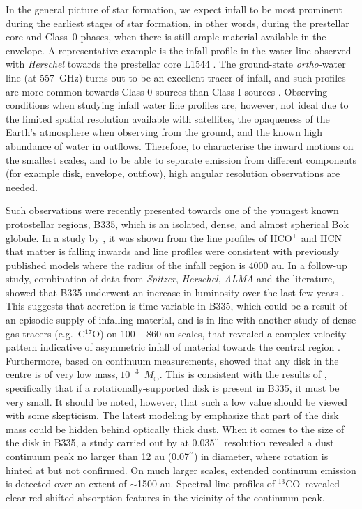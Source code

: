 \documentclass{aa}
\newcommand{\about}{$\sim$}                       %
\newcommand{\expo}[1]{$10^{#1}$}
\newcommand{\trettenco}{$^{13}$CO\xspace}
\newcommand{\asec}{$^{\prime \prime}$}
\newcommand{\msun}{\ensuremath{M_{\odot}}\xspace}
\begin{document}
In the general picture of star formation, we expect infall to be most prominent during the earliest stages of star formation, in other words, during the prestellar core and Class~0 \citep{Andre:1990fk} phases, when there is still ample material available in the envelope. A representative example is the infall profile in the water line observed with {\it Herschel} towards the prestellar core L1544 \citep{Caselli:2012rt}. The ground-state \textit{ortho-}water line (at 557~GHz) turns out to be an excellent tracer of infall, and such profiles are more common towards Class 0 sources than Class I sources \citep{Kristensen:2012kx,Mottram:2013qy}. Observing conditions when studying infall water line profiles are, however, not ideal due to the limited spatial resolution available with satellites, the opaqueness of the Earth's atmosphere when observing from the ground, and the known high abundance of water in outflows. Therefore, to characterise the inward motions on the smallest scales, and to be able to separate emission from different components (for example disk, envelope, outflow), high angular resolution observations are needed.

Such observations were recently presented towards one of the youngest known protostellar regions, B335, which is an isolated, dense, and almost spherical Bok globule. In a study by \citet{Evans:2015qp}, it was shown from the line profiles of HCO$^+$ and HCN that matter is falling inwards and line profiles were consistent with previously published models \citep{Evans:2005qy} where the radius of the infall region is 4000 au. In a follow-up study, combination of data from \textit{Spitzer}, \textit{Herschel}, \textit{ALMA} and the literature, showed that B335 underwent an increase in luminosity over the last few years \citep{Evans:2023aa}. This suggests that accretion is time-variable in B335, which could be a result of an episodic supply of infalling material, and is in line with another study of dense gas tracers (e.g.\ C$^{17}$O) on 100 -- 860 au scales, that revealed a complex velocity pattern indicative of asymmetric infall of material towards the central region \citep{Cabedo:2021hw}. Furthermore, based on continuum measurements, \citet{Evans:2015qp} showed that any disk in the centre is of very low mass,$~$\expo{-3}~\msun. This is consistent with the results of \citet{Yen:2015vf}, specifically that if a rotationally-supported disk is present in B335, it must be very small. It should be noted, however, that such a low value should be viewed with some skepticism. The latest modeling by \citet{Evans:2023aa} emphasize that part of the disk mass could be hidden behind optically thick dust. When it comes to the size of the disk in B335, a study carried out by \citet{Bjerkeli:2019ip} at 0.035\asec\ resolution revealed a dust continuum peak no larger than 12 au (0.07\asec) in diameter, where rotation is hinted at but not confirmed. On much larger scales, extended continuum emission is detected over an extent of \about 1500 au. Spectral line profiles of \trettenco\ revealed clear red-shifted absorption features in the vicinity of the continuum peak.
\end{document}

